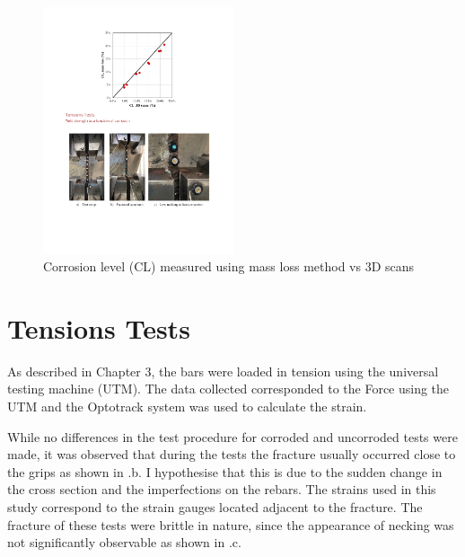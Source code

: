 \begin{figure}[htbp]
	\centering
    \includegraphics[width=0.5\textwidth]{VAC Thesis 2.0/Chapter-4/figs/3dscans_vs_massloss.pdf}
	\caption{Corrosion level (CL) measured using mass loss method vs 3D scans}
\label{fig:3dscans_vs_massloss}
\end{figure}

\newpage
\section{Tensions Tests}

As described in Chapter 3, the bars were loaded in tension using the universal testing machine (UTM). The data collected corresponded to the Force using the UTM and the Optotrack system was used to calculate the strain.

While no differences in the test procedure for corroded and uncorroded tests were made, it was observed that during the tests the fracture usually occurred close to the grips as shown in 
.b. I hypothesise that this is due to the sudden change in the cross section and the imperfections on the rebars. The strains used in this study correspond to the strain gauges located adjacent to the fracture. The fracture of these tests were brittle in nature, since the appearance of necking was not significantly observable as shown in .c.

